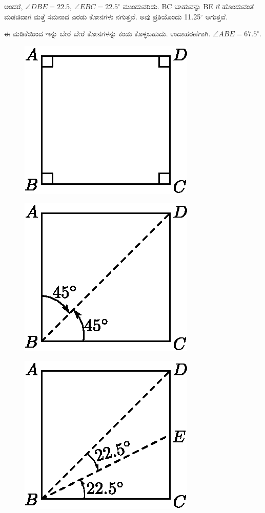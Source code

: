 ಅಂದರೆ, $\angle DBE = 22.5$, $\angle EBC = 22.5^\circ$ ಮುಂದುವರಿದು. BC ಬಾಹುವನ್ನು BE ಗೆ ಹೊಂದುವಂತೆ ಮಡಚಿದಾಗ ಮತ್ತೆ ಸಮನಾದ ಎರಡು ಕೋನಗಳು ನಗುತ್ತವೆ. ಅವು ಪ್ರತಿಯೊಂದು 11.25$^\circ$ ಆಗುತ್ತವೆ. 

ಈ ಮಡಿಕೆಯಿಂದ ಇನ್ನು ಬೇರೆ ಬೇರೆ ಕೋನಗಳನ್ನು ಕಂಡು ಕೊಳ್ಳಬಹುದು. ಉದಾಹರಣೆಗಾಗಿ.  $\angle ABE = 67.5^\circ$.
\begin{figure}[H]
\centering
\includegraphics[scale=.98]{src/figure/chap1/fig1-7a.eps}
\end{figure}
\begin{figure}[H]
\centering
\includegraphics[scale=.98]{src/figure/chap1/fig1-7b.eps}
\end{figure}
\begin{figure}[H]
\centering
\includegraphics[scale=.98]{src/figure/chap1/fig1-7c.eps}
\end{figure}
